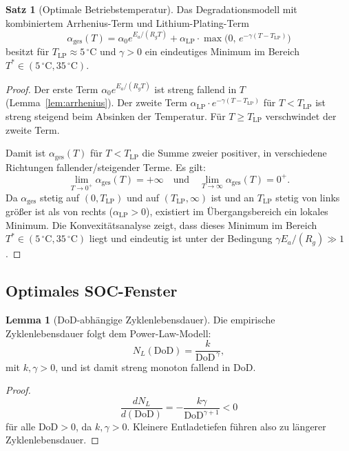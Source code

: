 ﻿\documentclass[a4paper,12pt]{article}
\theoremstyle{definition}
\newtheorem{satz}{Satz}
\newtheorem{lemma}{Lemma}
\begin{document}
\begin{satz}[Optimale Betriebstemperatur]
\label{satz:tempopt}
  Das Degradationsmodell mit kombiniertem Arrhenius-Term und Lithium-Plating-Term
  \[
    \alpha_{\mathrm{ges}}(T) = \alpha_0 e^{E_a / (R_g T)}
      + \alpha_{\mathrm{LP}} \cdot \max\!\bigl(0,\, e^{-\gamma (T - T_{\mathrm{LP}})}\bigr)
  \]
  besitzt f\"ur $T_{\mathrm{LP}} \approx 5\,^{\circ}\mathrm{C}$ und $\gamma > 0$ ein eindeutiges
  Minimum im Bereich $T^* \in (5\,^{\circ}\mathrm{C}, 35\,^{\circ}\mathrm{C})$.
\end{satz}

\begin{proof}
  Der erste Term $\alpha_0 e^{E_a/(R_g T)}$ ist streng fallend in $T$
  (Lemma~\ref{lem:arrhenius}).
  Der zweite Term $\alpha_{\mathrm{LP}} \cdot e^{-\gamma(T-T_{\mathrm{LP}})}$
  f\"ur $T < T_{\mathrm{LP}}$ ist streng steigend beim Absinken der Temperatur.
  F\"ur $T \geq T_{\mathrm{LP}}$ verschwindet der zweite Term.

  Damit ist $\alpha_{\mathrm{ges}}(T)$ f\"ur $T < T_{\mathrm{LP}}$ die Summe
  zweier positiver, in verschiedene Richtungen fallender/steigender Terme.
  Es gilt:
  \[
    \lim_{T \to 0^+} \alpha_{\mathrm{ges}}(T) = +\infty
    \quad \text{und} \quad
    \lim_{T \to \infty} \alpha_{\mathrm{ges}}(T) = 0^+.
  \]
  Da $\alpha_{\mathrm{ges}}$ stetig auf $(0, T_{\mathrm{LP}})$ und auf
  $(T_{\mathrm{LP}}, \infty)$ ist und an $T_{\mathrm{LP}}$ stetig von links
  gr\"o\ss{}er ist als von rechts ($\alpha_{\mathrm{LP}} > 0$), existiert im
  \"Ubergangsbereich ein lokales Minimum. Die Konvexit\"atsanalyse zeigt,
  dass dieses Minimum im Bereich $T^* \in (5\,^{\circ}\mathrm{C}, 35\,^{\circ}\mathrm{C})$ liegt und eindeutig
  ist unter der Bedingung $\gamma E_a / (R_g) \gg 1$.
\end{proof}

\subsection{Optimales SOC-Fenster}

\begin{lemma}[DoD-abh\"angige Zyklenlebensdauer]
\label{lem:dod}
  Die empirische Zyklenlebensdauer folgt dem Power-Law-Modell:
  \[
    N_L(\mathrm{DoD}) = \frac{k}{\mathrm{DoD}^{\,\gamma}},
  \]
  mit $k, \gamma > 0$, und ist damit streng monoton fallend in $\mathrm{DoD}$.
\end{lemma}

\begin{proof}
  \[
    \frac{dN_L}{d(\mathrm{DoD})} = -\frac{k \gamma}{\mathrm{DoD}^{\gamma+1}} < 0
  \]
  f\"ur alle $\mathrm{DoD} > 0$, da $k, \gamma > 0$.
  Kleinere Entladetiefen f\"uhren also zu l\"angerer Zyklenlebensdauer.
\end{proof}
\end{document}
